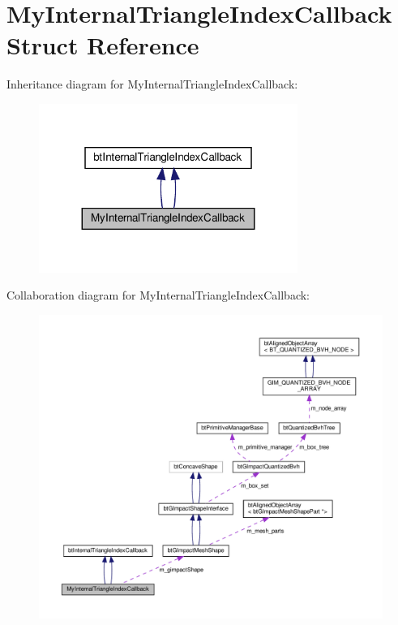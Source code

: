 \hypertarget{structMyInternalTriangleIndexCallback}{}\section{My\+Internal\+Triangle\+Index\+Callback Struct Reference}
\label{structMyInternalTriangleIndexCallback}


Inheritance diagram for My\+Internal\+Triangle\+Index\+Callback\+:
\nopagebreak
\begin{figure}[H]
\begin{center}
\leavevmode
\includegraphics[width=239pt]{structMyInternalTriangleIndexCallback__inherit__graph}
\end{center}
\end{figure}


Collaboration diagram for My\+Internal\+Triangle\+Index\+Callback\+:
\nopagebreak
\begin{figure}[H]
\begin{center}
\leavevmode
\includegraphics[width=350pt]{structMyInternalTriangleIndexCallback__coll__graph}
\end{center}
\end{figure}
